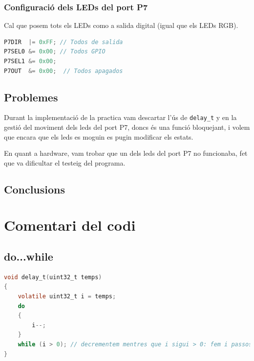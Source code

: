 \documentclass[12pt,a4paper]{article}
\begin{document}
\subsubsection{Configuració dels LEDs del port P7}

Cal que posem tots els LEDs como a salida digital (igual que els LEDs RGB).

\begin{lstlisting}[language=C]
P7DIR  |= 0xFF; // Todos de salida
P7SEL0 &= 0x00; // Todos GPIO
P7SEL1 &= 0x00;
P7OUT  &= 0x00;  // Todos apagados
\end{lstlisting}



\subsection{Problemes}
Durant la implementació de la practica vam descartar l'ús de \texttt{delay\_t} y en la gestió del moviment dels leds del port P7, doncs és una funció bloquejant, i volem que encara que els leds es moguin es pugin modificar els estats.

En quant a hardware, vam trobar que un dels leds del port P7 no funcionaba, fet que va dificultar el testeig del programa.

\subsection{Conclusions}

\section{Comentari del codi}


\subsection{do...while}

\begin{lstlisting}[language=C]
void delay_t(uint32_t temps)
{
    volatile uint32_t i = temps;
    do
    {
        i--;
    }
    while (i > 0); // decrementem mentres que i sigui > 0: fem i passos
}
\end{lstlisting}
\end{document}
